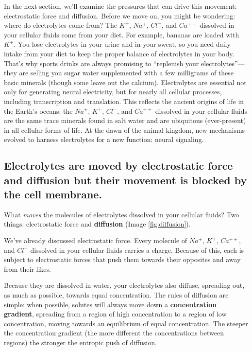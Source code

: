 \documentclass[
]{book}
\begin{document}
In the next section, we'll examine the pressures that can drive this movement: electrostatic force and diffusion. Before we move on, you might be wondering: where do electrolytes come from? The \(K^+\), \(Na^+\), \(Cl^{-}\), and \(Ca^{++}\) dissolved in your cellular fluids come from your diet. For example, bananas are loaded with \(K^+\). You lose electrolytes in your urine and in your sweat, so you need daily intake from your diet to keep the proper balance of electrolytes in your body. That's why sports drinks are always promising to ``replenish your electrolytes''---they are selling you sugar water supplemented with a few milligrams of these basic minerals (though some leave out the calcium). Electrolytes are essential not only for generating neural electricity, but for nearly all cellular processes, including transcription and translation. This reflects the ancient origins of life in the Earth's oceans: the \(Na^+\), \(K^+\), \(Cl^{-}\), and \(Ca^{++}\) dissolved in your cellular fluids are the same trace minerals found in salt water and are ubiquitous (ever-present) in all cellular forms of life. At the dawn of the animal kingdom, new mechanisms evolved to harness electrolytes for a new function: neural signaling.

\hypertarget{electrolytes-are-moved-by-electrostatic-force-and-diffusion-but-their-movement-is-blocked-by-the-cell-membrane.}{%
\subsection{Electrolytes are moved by electrostatic force and diffusion but their movement is blocked by the cell membrane.}\label{electrolytes-are-moved-by-electrostatic-force-and-diffusion-but-their-movement-is-blocked-by-the-cell-membrane.}}

What \emph{moves} the molecules of electrolytes dissolved in your cellular fluids? Two things: electrostatic force and \textbf{diffusion }(Image \ref{fig:diffusion}).

We've already discussed electrostatic force. Every molecule of \(Na^+\), \(K^+\), \(Ca^{++}\), and \(Cl^{-}\) dissolved in your cellular fluids carries a charge. Because of this, each is subject to electrostatic forces that push them towards their opposites and away from their likes.

Because they are dissolved in water, your electrolytes also diffuse, spreading out, as much as possible, towards equal concentration. The rules of diffusion are simple: when possible, solutes will always move down a \textbf{concentration gradient}, spreading from a region of high concentration to a region of low concentration, moving towards an equilibrium of equal concentration. The steeper the concentration gradient (the more different the concentrations between regions) the stronger the entropic push of diffusion.
\end{document}

